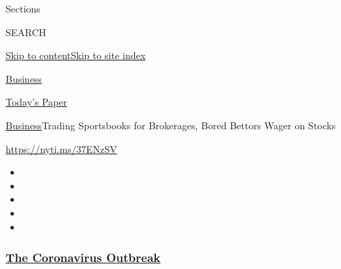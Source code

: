 Sections

SEARCH

\protect\hyperlink{site-content}{Skip to
content}\protect\hyperlink{site-index}{Skip to site index}

\href{https://www.nytimes3xbfgragh.onion/section/business}{Business}

\href{https://myaccount.nytimes3xbfgragh.onion/auth/login?response_type=cookie\&client_id=vi}{}

\href{https://www.nytimes3xbfgragh.onion/section/todayspaper}{Today's
Paper}

\href{/section/business}{Business}\textbar{}Trading Sportsbooks for
Brokerages, Bored Bettors Wager on Stocks

\url{https://nyti.ms/37ENzSV}

\begin{itemize}
\item
\item
\item
\item
\item
\end{itemize}

\hypertarget{the-coronavirus-outbreak}{%
\subsubsection{\texorpdfstring{\href{https://www.nytimes3xbfgragh.onion/news-event/coronavirus?name=styln-coronavirus-markets\&region=TOP_BANNER\&block=storyline_menu_recirc\&action=click\&pgtype=Article\&impression_id=d268bde0-f52b-11ea-8e9a-cf021cc1e5be\&variant=undefined}{The
Coronavirus
Outbreak}}{The Coronavirus Outbreak}}\label{the-coronavirus-outbreak}}

